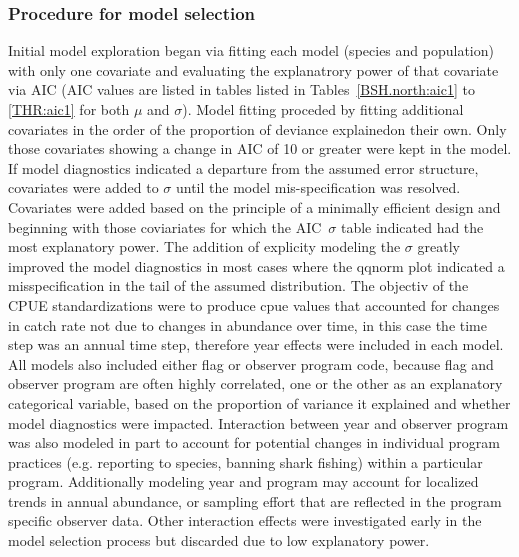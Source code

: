 \subsubsection{Procedure for model selection}
Initial model exploration began via fitting each model (species and population) with only one covariate and evaluating the explanatrory power of that covariate via AIC  (AIC values are listed in tables  listed in Tables~\ref{BSH.north:aic1} to \ref{THR:aic1} for both $\mu$ and $\sigma$). %
Model fitting proceded by fitting additional covariates in the order of the proportion of deviance explainedon their own.  Only those covariates showing a change in AIC of 10 or greater were kept in the model.
If model diagnostics indicated a departure from the assumed error structure, covariates were added to $\sigma$ until the model mis-specification was resolved. Covariates were added based on the principle of a minimally efficient design and beginning with those coviariates for which the AIC~$\sigma$ table indicated had the most explanatory power.  
The addition of explicity modeling the $\sigma$ greatly improved the  model diagnostics in  most cases where the qqnorm plot indicated a misspecification in the tail of the assumed distribution.  The objectiv of the CPUE standardizations were to produce cpue values that accounted for changes in catch rate not due to changes in abundance over time, in this case the time step was an annual time step, therefore year effects were included in each model. 
All models also included either flag or observer program code, because flag and observer program are often highly correlated, one or the other as an explanatory categorical variable, based on the proportion of variance it explained and whether model diagnostics were impacted.
Interaction between year and observer program was also modeled in part to account for potential changes in individual program practices (e.g. reporting to species, banning shark fishing) within a particular program.  Additionally modeling year and program may account for localized trends in annual abundance, or sampling effort that are reflected in the program specific observer data. Other interaction effects were investigated early in the model selection process but discarded due to low explanatory power.%
                                                                                    
